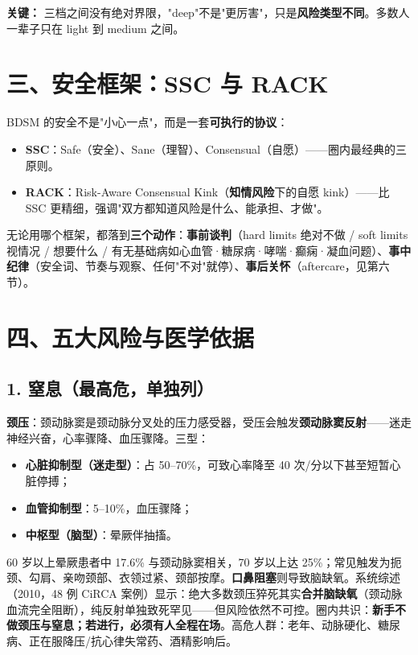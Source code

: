 \documentclass[12pt,UTF8,openany]{ctexbook}
\begin{document}
\vspace{0.5em}
\noindent\textbf{关键：} 三档之间没有绝对界限，"deep"不是"更厉害"，只是\textbf{风险类型不同}。多数人一辈子只在 light 到 medium 之间。

\section{三、安全框架：SSC 与 RACK}

BDSM 的安全不是"小心一点"，而是一套\textbf{可执行的协议}：

\begin{itemize}
  \item \textbf{SSC}：Safe（安全）、Sane（理智）、Consensual（自愿）——圈内最经典的三原则。
  \item \textbf{RACK}：Risk-Aware Consensual Kink（\textbf{知情风险}下的自愿 kink）——比 SSC 更精细，强调"双方都知道风险是什么、能承担、才做"。
\end{itemize}

无论用哪个框架，都落到\textbf{三个动作}：\textbf{事前谈判}（hard limits 绝对不做 / soft limits 视情况 / 想要什么 / 有无基础病如心血管·糖尿病·哮喘·癫痫·凝血问题）、\textbf{事中纪律}（安全词、节奏与观察、任何"不对"就停）、\textbf{事后关怀}（aftercare，见第六节）。

\section{四、五大风险与医学依据}

\subsection*{1. 窒息（最高危，单独列）}
\textbf{颈压}：颈动脉窦是颈动脉分叉处的压力感受器，受压会触发\textbf{颈动脉窦反射}——迷走神经兴奋，心率骤降、血压骤降。三型：
\begin{itemize}
  \item \textbf{心脏抑制型（迷走型）}：占 50--70\%，可致心率降至 40 次/分以下甚至短暂心脏停搏；
  \item \textbf{血管抑制型}：5--10\%，血压骤降；
  \item \textbf{中枢型（脑型）}：晕厥伴抽搐。
\end{itemize}
60 岁以上晕厥患者中 17.6\% 与颈动脉窦相关，70 岁以上达 25\%；常见触发为扼颈、勾肩、亲吻颈部、衣领过紧、颈部按摩。\textbf{口鼻阻塞}则导致脑缺氧。系统综述（2010，48 例 CiRCA 案例）显示：绝大多数颈压猝死其实\textbf{合并脑缺氧}（颈动脉血流完全阻断），纯反射单独致死罕见——但风险依然不可控。圈内共识：\textbf{新手不做颈压与窒息；若进行，必须有人全程在场}。高危人群：老年、动脉硬化、糖尿病、正在服降压/抗心律失常药、酒精影响后。
\end{document}
